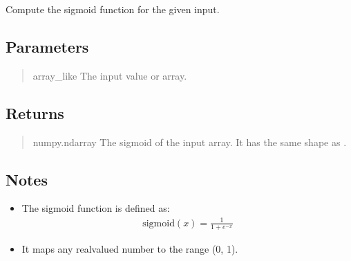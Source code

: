 \documentclass[a4paper,11pt,openany,english]{sphinxmanual}
\begin{document}
\begin{fulllineitems}
\label{\detokenize{api_misc:xtremes.miscellaneous.sigmoid}}
\pysigstartsignatures
{}
\pysigstopsignatures
\sphinxAtStartPar
Compute the sigmoid function for the given input.


\subsection{Parameters}
\label{\detokenize{api_misc:parameters}}\begin{quote}\begin{description}
\sphinxAtStartPar
array\_like
The input value or array.

\end{description}\end{quote}


\subsection{Returns}
\label{\detokenize{api_misc:returns}}\begin{quote}\begin{description}
\sphinxAtStartPar
numpy.ndarray
The sigmoid of the input array. It has the same shape as .

\end{description}\end{quote}


\subsection{Notes}
\label{\detokenize{api_misc:notes}}\begin{itemize}
\item {} 
\sphinxAtStartPar
The sigmoid function is defined as:
\begin{equation*}
\begin{split}\text{sigmoid}(x) = \frac{1}{1 + e^{-x}}\end{split}
\end{equation*}
\item {} 
\sphinxAtStartPar
It maps any real\sphinxhyphen{}valued number to the range (0, 1).

\end{itemize}



\end{fulllineitems}
\end{document}
